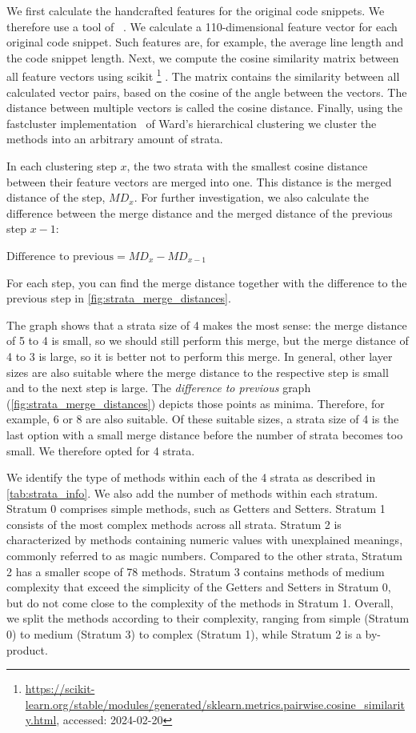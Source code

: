 \documentclass[%
class=scrreprt,
chapterprefix=false,%
open=right,%
twoside=true,%
paper=a4,%
logofile={Logo\_zentral\_farbig\_EN.png},%
thesistype=master,%
UKenglish,%
]{se2thesis}
\newcounter{urlfootnote}
\newcommand{\onecurl}[2]{%
	\stepcounter{urlfootnote}%
	\expandafter\def\csname urlfootnote:#1\endcsname{\theurlfootnote}%
	\footnote{\label{url:#1}\url{#1}, accessed: #2}%
}
\newcommand{\curl}[2]{%
		\onecurl{#1}{#2}%
}
\theoremstyle{definition}
\begin{document}
	We first calculate the handcrafted features for the original code snippets. We therefore use a tool of \citeauthor{scalabrino2018comprehensive}~\cite{scalabrino2018comprehensive}. We calculate a 110-dimensional feature vector for each original code snippet.
	Such features are, for example, the average line length and the code snippet length.
	Next, we compute the cosine similarity matrix between all feature vectors using scikit\curl{https://scikit-learn.org/stable/modules/generated/sklearn.metrics.pairwise.cosine_similarity.html}{2024-02-20}.
	The matrix contains the similarity between all calculated vector pairs, based on the cosine of the angle between the vectors. The distance between multiple vectors is called the cosine distance.
	Finally, using the fastcluster implementation~\cite{mullner2013fastcluster} of Ward's hierarchical clustering we cluster the methods into an arbitrary amount of strata.
	
	In each clustering step $x$, the two strata with the smallest cosine distance between their feature vectors are merged into one. This distance is the merged distance of the step, $MD_x$.
	For further investigation, we also calculate the difference between the merge distance and the merged distance of the previous step $x-1$:
	\begin{center}
		$\text{Difference to previous} = MD_x - MD_{x-1}$
	\end{center}
	For each step, you can find the merge distance together with the difference to the previous step in \autoref{fig:strata_merge_distances}.
	
	The graph shows that a strata size of 4 makes the most sense: the merge distance of 5 to 4 is small, so we should still perform this merge, but the merge distance of 4 to 3 is large, so it is better not to perform this merge.
	In general, other layer sizes are also suitable where the merge distance to the respective step is small and to the next step is large. The \textit{difference to previous} graph (\autoref{fig:strata_merge_distances}) depicts those points as minima. Therefore, for example, 6 or 8 are also suitable.
	Of these suitable sizes, a strata size of 4 is the last option with a small merge distance before the number of strata becomes too small.
	We therefore opted for 4 strata.
	
	We identify the type of methods within each of the 4 strata as described in \autoref{tab:strata_info}. We also add the number of methods within each stratum. 
	Stratum 0 comprises simple methods, such as Getters and Setters. Stratum 1 consists of the most complex methods across all strata. 
	Stratum 2 is characterized by methods containing numeric values with unexplained meanings, commonly referred to as magic numbers. Compared to the other strata, Stratum 2 has a smaller scope of 78 methods. 
	Stratum 3 contains methods of medium complexity that exceed the simplicity of the Getters and Setters in Stratum 0, but do not come close to the complexity of the methods in Stratum 1. 
	Overall, we split the methods according to their complexity, ranging from simple (Stratum 0) to medium (Stratum 3) to complex (Stratum 1), while Stratum 2 is a by-product.
	
\end{document}
